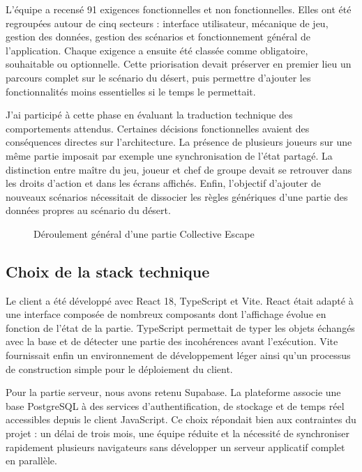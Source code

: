 L'équipe a recensé 91 exigences fonctionnelles et non fonctionnelles. Elles ont été regroupées autour de cinq secteurs : interface utilisateur, mécanique de jeu, gestion des données, gestion des scénarios et fonctionnement général de l'application. Chaque exigence a ensuite été classée comme obligatoire, souhaitable ou optionnelle. Cette priorisation devait préserver en premier lieu un parcours complet sur le scénario du désert, puis permettre d'ajouter les fonctionnalités moins essentielles si le temps le permettait.

J'ai participé à cette phase en évaluant la traduction technique des comportements attendus. Certaines décisions fonctionnelles avaient des conséquences directes sur l'architecture. La présence de plusieurs joueurs sur une même partie imposait par exemple une synchronisation de l'état partagé. La distinction entre maître du jeu, joueur et chef de groupe devait se retrouver dans les droits d'action et dans les écrans affichés. Enfin, l'objectif d'ajouter de nouveaux scénarios nécessitait de dissocier les règles génériques d'une partie des données propres au scénario du désert.

\begin{figure}[H]
\centering
{}
\caption{Déroulement général d'une partie Collective Escape}
\label{fig:brise-glace-deroulement}
\end{figure}

\subsection{Choix de la stack technique}

Le client a été développé avec React 18, TypeScript et Vite. React était adapté à une interface composée de nombreux composants dont l'affichage évolue en fonction de l'état de la partie. TypeScript permettait de typer les objets échangés avec la base et de détecter une partie des incohérences avant l'exécution. Vite fournissait enfin un environnement de développement léger ainsi qu'un processus de construction simple pour le déploiement du client.

Pour la partie serveur, nous avons retenu Supabase. La plateforme associe une base PostgreSQL à des services d'authentification, de stockage et de temps réel accessibles depuis le client JavaScript. Ce choix répondait bien aux contraintes du projet : un délai de trois mois, une équipe réduite et la nécessité de synchroniser rapidement plusieurs navigateurs sans développer un serveur applicatif complet en parallèle.

